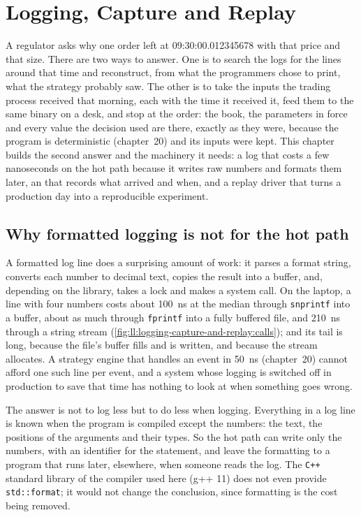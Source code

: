 \chapter{Logging, Capture and Replay}\label{ch:ll:logging-capture-and-replay}

A regulator asks why one order left at 09:30:00.012345678 with that price and that size. There are two ways to answer. One is
to search the logs for the lines around that time and reconstruct, from what the programmers chose to print, what the strategy
probably saw. The other is to take the inputs the trading process received that morning, each with the time it received
it, feed them to the same binary on a desk, and stop at the order: the book, the parameters in force and every value the
decision used are there, exactly as they were, because the program is deterministic (chapter~20) and its inputs were kept.
This chapter builds the second answer and the machinery it needs: a log that costs a few nanoseconds on the hot path because
it writes raw numbers and formats them later, an  that records what arrived and when, and a replay driver that
turns a production day into a reproducible experiment.

\section{Why formatted logging is not for the hot path}

A formatted log line does a surprising amount of work: it parses a format string, converts each number to decimal text,
copies the result into a buffer, and, depending on the library, takes a lock and makes a system call. On the laptop, a line
with four numbers costs about \qty{100}{\nano\second} at the median through \texttt{snprintf} into a buffer, about as much
through \texttt{fprintf} into a fully buffered file, and \qty{210}{\nano\second} through a string stream
(\cref{fig:ll:logging-capture-and-replay:calls}); and its tail is long, because the file's buffer fills and is written, and
because the stream allocates. A strategy engine that handles an event in \qty{50}{\nano\second} (chapter~20) cannot afford one
such line per event, and a system whose logging is switched off in production to save that time has nothing to look at when
something goes wrong.

The answer is not to log less but to do less when logging. Everything in a log line is known when the program is compiled
except the numbers: the text, the positions of the arguments and their types. So the hot path can write only the numbers,
with an identifier for the statement, and leave the formatting to a program that runs later, elsewhere, when someone reads
the log. The \texttt{C++} standard library of the compiler used here (g++ 11) does not even provide \texttt{std::format}; it would not
change the conclusion, since formatting is the cost being removed.

